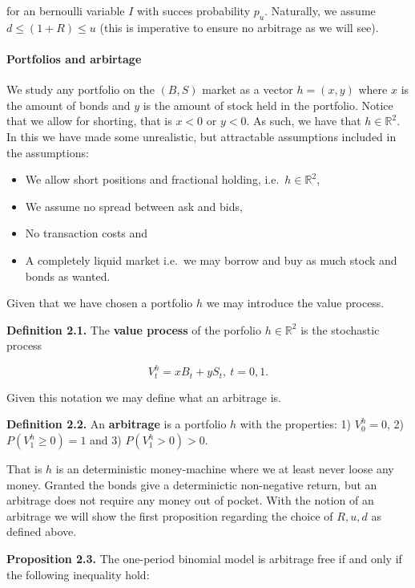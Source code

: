 \documentclass[
]{article}
\providecommand{\tightlist}{%
  \setlength{\itemsep}{0pt}\setlength{\parskip}{0pt}}
\begin{document}
for an bernoulli variable \(I\) with succes probability \(p_u\).
Naturally, we assume \(d\le (1+R)\le u\) (this is imperative to ensure
no arbitrage as we will see).

\hypertarget{portfolios-and-arbirtage}{%
\paragraph{Portfolios and arbirtage}\label{portfolios-and-arbirtage}}

We study any portfolio on the \((B,S)\) market as a vector \(h=(x,y)\)
where \(x\) is the amount of bonds and \(y\) is the amount of stock held
in the portfolio. Notice that we allow for shorting, that is \(x<0\) or
\(y<0\). As such, we have that \(h\in \mathbb{R}^2\). In this we have
made some unrealistic, but attractable assumptions included in the
assumptions:

\begin{itemize}
\tightlist
\item
  We allow short positions and fractional holding,
  i.e.~\(h\in \mathbb{R}^2\),
\item
  We assume no spread between ask and bids,
\item
  No transaction costs and
\item
  A completely liquid market i.e.~we may borrow and buy as much stock
  and bonds as wanted.
\end{itemize}

Given that we have chosen a portfolio \(h\) we may introduce the value
process.

\textbf{Definition 2.1.} The \textbf{value process} of the porfolio
\(h\in\mathbb{R}^2\) is the stochastic process

\[V^h_t=xB_t+yS_t,\ t=0,1.\]

Given this notation we may define what an arbitrage is.

\textbf{Definition 2.2.} An \textbf{arbitrage} is a portfolio \(h\) with
the properties: 1) \(V^h_0=0\), 2) \(P(V^h_1\ge 0)=1\) and 3)
\(P(V^h_1>0)>0\).

That is \(h\) is an deterministic money-machine where we at least never
loose any money. Granted the bonds give a determinictic non-negative
return, but an arbitrage does not require any money out of pocket. With
the notion of an arbitrage we will show the first proposition regarding
the choice of \(R,u,d\) as defined above.

\textbf{Proposition 2.3.} The one-period binomial model is arbitrage
free if and only if the following inequality hold:
\end{document}

